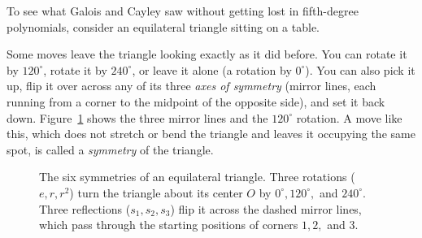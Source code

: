 To see what Galois and Cayley saw without getting lost in fifth-degree polynomials, consider an equilateral triangle sitting on a table.

Some moves leave the triangle looking exactly as it did before. You can rotate it by $120^\circ$, rotate it by $240^\circ$, or leave it alone (a rotation by $0^\circ$). You can also pick it up, flip it over across any of its three \emph{axes of symmetry} (mirror lines, each running from a corner to the midpoint of the opposite side), and set it back down. Figure~\ref{21:fig-triangle-symmetries} shows the three mirror lines and the $120^\circ$ rotation. A move like this, which does not stretch or bend the triangle and leaves it occupying the same spot, is called a \emph{symmetry} of the triangle.

\begin{figure}[htbp]
\centering
{}
\caption{The six symmetries of an equilateral triangle. Three rotations ($e, r, r^2$) turn the triangle about its center $O$ by $0^\circ, 120^\circ,$ and $240^\circ$. Three reflections ($s_1, s_2, s_3$) flip it across the dashed mirror lines, which pass through the starting positions of corners $1, 2,$ and $3$.}\label{21:fig-triangle-symmetries}
\end{figure}

